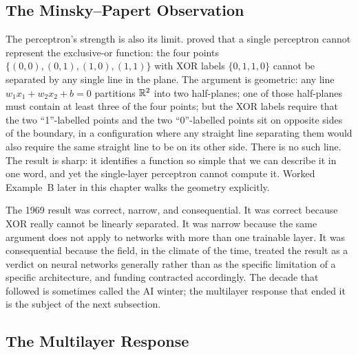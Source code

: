 \subsection{The Minsky--Papert Observation}

The perceptron's strength is also its limit. \citet{minsky1969perceptrons}
proved that a single perceptron cannot represent the
exclusive-or function: the four points
$\{(0,0), (0,1), (1,0), (1,1)\}$ with XOR labels $\{0, 1, 1, 0\}$
cannot be separated by any single line in the plane. The argument
is geometric: any line $w_1 x_1 + w_2 x_2 + b = 0$ partitions
$\mathbb{R}^2$ into two half-planes; one of those half-planes must
contain at least three of the four points; but the XOR labels
require that the two ``1''-labelled points and the two
``0''-labelled points sit on opposite sides of the boundary, in a
configuration where any straight line separating them would also
require the same straight line to be on its other side. There is
no such line. The result is sharp: it identifies a function so
simple that we can describe it in one word, and yet the
single-layer perceptron cannot compute it. Worked Example~B
later in this chapter walks the geometry explicitly.

The 1969 result was correct, narrow, and consequential. It was
correct because XOR really cannot be linearly separated. It was
narrow because the same argument does not apply to networks with
more than one trainable layer. It was consequential because the
field, in the climate of the time, treated the result as a verdict
on neural networks generally rather than as the specific
limitation of a specific architecture, and funding contracted
accordingly. The decade that followed is sometimes called the AI
winter; the multilayer response that ended it is the subject of
the next subsection.

\subsection{The Multilayer Response}


